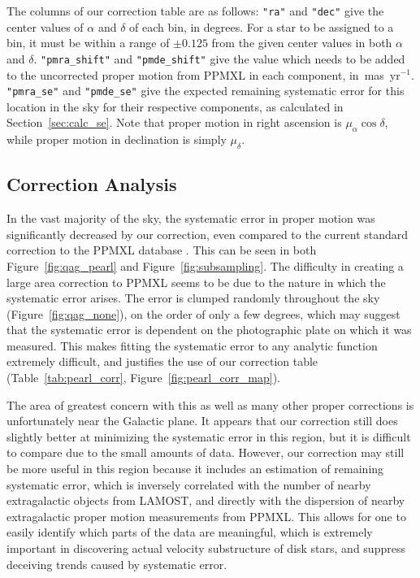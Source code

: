 \documentclass[11pt,preprint]{aastex6}
\begin{document}
The columns of our correction table are as follows:
\verb|"ra"| and \verb|"dec"| give the center values of $\alpha$ and $\delta$ of each bin, in degrees. For a star to be assigned to a bin, it must be within a range of $\pm 0.125$ from the given center values in both $\alpha$ and $\delta$.
\verb|"pmra_shift"| and \verb|"pmde_shift"| give the value which needs to be added to the uncorrected proper motion from PPMXL in each component, in~mas~yr$^{-1}$.
\verb|"pmra_se"| and \verb|"pmde_se"| give the expected remaining systematic error for this location in the sky for their respective components, as calculated in Section~\ref{sec:calc_se}.
Note that proper motion in right ascension is $\mu_{\alpha}\cos{\delta}$, while proper motion in declination is simply $\mu_{\delta}$.


\subsection{Correction Analysis} \label{sec:corr_analysis}

In the vast majority of the sky, the systematic error in proper motion was significantly decreased by our correction, even compared to the current standard correction to the PPMXL database \citep{Vickers2016}.
This can be seen in both Figure~\ref{fig:qag_pearl} and Figure~\ref{fig:subsampling}.
The difficulty in creating a large area correction to PPMXL seems to be due to the nature in which the systematic error arises.
The error is clumped randomly throughout the sky (Figure~\ref{fig:qag_none}), on the order of only a few degrees, which may suggest that the systematic error is dependent on the photographic plate on which it was measured.
This makes fitting the systematic error to any analytic function extremely difficult, and justifies the use of our correction table (Table~\ref{tab:pearl_corr}, Figure~\ref{fig:pearl_corr_map}).

The area of greatest concern with this as well as many other proper corrections is unfortunately near the Galactic plane.
It appears that our correction still does slightly better at minimizing the systematic error in this region, but it is difficult to compare due to the small amounts of data.
However, our correction may still be more useful in this region because it includes an estimation of remaining systematic error, which is inversely correlated with the number of nearby extragalactic objects from LAMOST, and directly with the dispersion of nearby extragalactic proper motion measurements from PPMXL.
This allows for one to easily identify which parts of the data are meaningful, which is extremely important in discovering actual velocity substructure of disk stars, and suppress deceiving trends caused by systematic error.
\end{document}
